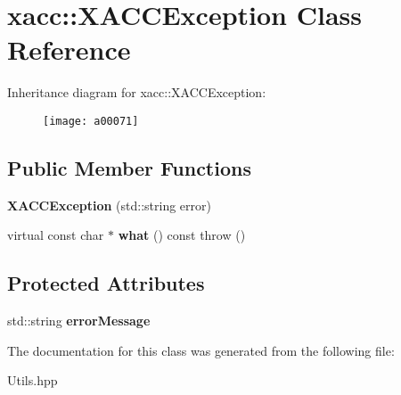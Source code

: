 \hypertarget{a00071}{}\section{xacc\+:\+:X\+A\+C\+C\+Exception Class Reference}
\label{a00071}
Inheritance diagram for xacc\+:\+:X\+A\+C\+C\+Exception\+:\begin{figure}[H]
\begin{center}
\leavevmode
\texttt{[image: a00071]}
\end{center}
\end{figure}
\subsection*{Public Member Functions}
\begin{DoxyCompactItemize}
\item 
{\bfseries X\+A\+C\+C\+Exception} (std\+::string error)\hypertarget{a00071_ab62415ce6e1dd25fb1a074f5741007c9}{}\label{a00071_ab62415ce6e1dd25fb1a074f5741007c9}

\item 
virtual const char $\ast$ {\bfseries what} () const   throw ()\hypertarget{a00071_a5b105218373a9ccd9aac69b6950a017b}{}\label{a00071_a5b105218373a9ccd9aac69b6950a017b}

\end{DoxyCompactItemize}
\subsection*{Protected Attributes}
\begin{DoxyCompactItemize}
\item 
std\+::string {\bfseries error\+Message}\hypertarget{a00071_a31f64c6fb215570571b9b4a3d47eadd0}{}\label{a00071_a31f64c6fb215570571b9b4a3d47eadd0}

\end{DoxyCompactItemize}


The documentation for this class was generated from the following file\+:\begin{DoxyCompactItemize}
\item 
Utils.\+hpp\end{DoxyCompactItemize}
